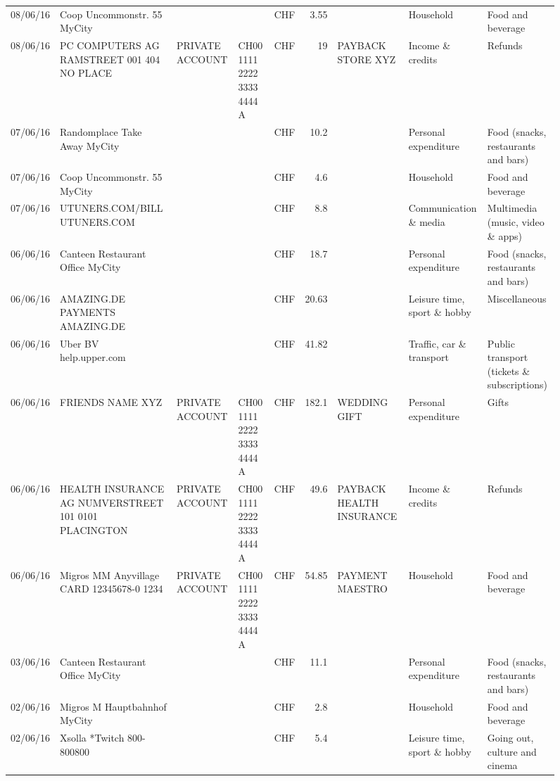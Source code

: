 \begin{landscape}
\begin{sidewaysfigure}
\begin{table}[h]
\begin{center}
\begin{tabular}{rllllrlll}
		08/06/16 & Coop Uncommonstr. 55   MyCity &       &       & CHF   & 3.55  &       & Household & Food and beverage \\
		08/06/16 & PC COMPUTERS AG RAMSTREET 001 404 NO PLACE & PRIVATE ACCOUNT & CH00 1111 2222 3333 4444 A & CHF   & 19    & PAYBACK STORE XYZ & Income \& credits & Refunds \\
		07/06/16 & Randomplace Take Away     MyCity &       &       & CHF   & 10.2  &       & Personal expenditure & Food (snacks, restaurants and bars) \\
		07/06/16 & Coop Uncommonstr. 55   MyCity &       &       & CHF   & 4.6   &       & Household & Food and beverage \\
		07/06/16 & UTUNERS.COM/BILL          UTUNERS.COM &       &       & CHF   & 8.8   &       & Communication \& media & Multimedia (music, video \& apps) \\
		06/06/16 & Canteen Restaurant Office      MyCity &       &       & CHF   & 18.7  &       & Personal expenditure & Food (snacks, restaurants and bars) \\
		06/06/16 & AMAZING.DE PAYMENTS       AMAZING.DE &       &       & CHF   & 20.63 &       & Leisure time, sport \& hobby & Miscellaneous \\
		06/06/16 & Uber BV                  help.upper.com &       &       & CHF   & 41.82 &       & Traffic, car \& transport & Public transport (tickets \& subscriptions) \\
		06/06/16 & FRIENDS NAME XYZ & PRIVATE ACCOUNT & CH00 1111 2222 3333 4444 A & CHF   & 182.1 & WEDDING GIFT & Personal expenditure & Gifts \\
		06/06/16 & HEALTH INSURANCE AG NUMVERSTREET 101 0101 PLACINGTON & PRIVATE ACCOUNT & CH00 1111 2222 3333 4444 A & CHF   & 49.6  & PAYBACK HEALTH INSURANCE & Income \& credits & Refunds \\
		06/06/16 & Migros MM Anyvillage CARD 12345678-0 1234 & PRIVATE ACCOUNT & CH00 1111 2222 3333 4444 A & CHF   & 54.85 & PAYMENT MAESTRO & Household & Food and beverage \\
		03/06/16 & Canteen Restaurant Office      MyCity &       &       & CHF   & 11.1  &       & Personal expenditure & Food (snacks, restaurants and bars) \\
		02/06/16 & Migros M Hauptbahnhof    MyCity &       &       & CHF   & 2.8   &       & Household & Food and beverage \\
		02/06/16 & Xsolla *Twitch           800-800800 &       &       & CHF   & 5.4   &       & Leisure time, sport \& hobby & Going out, culture and cinema \\

\end{tabular}
\end{center}
\end{table}
\end{sidewaysfigure}
\end{landscape}
